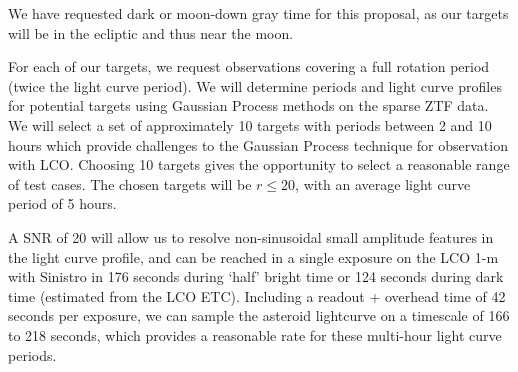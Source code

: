 \documentclass[11pt]{article}
\begin{document}


%

\technicaldescription
We have requested dark or moon-down gray time for this proposal, as our
targets will be in the ecliptic and thus near the moon.

For each of our targets, we request observations covering a
full rotation period (twice the light curve period). We will determine
periods and light curve profiles for potential targets using Gaussian
Process methods on the sparse ZTF data. We will select a set of
approximately 10 targets with periods between 2 and 10 hours which
provide challenges to the Gaussian Process technique for observation
with LCO. Choosing 10 targets gives the opportunity to select a reasonable range
of test cases. The chosen targets will be $r\le20$, with an average 
light curve period of 5 hours.

A SNR of 20 will allow us to resolve non-sinusoidal small amplitude
features in the light curve profile, and can be reached in a single
exposure on the LCO 1-m with Sinistro in 176 seconds during
`half' bright time or 124 seconds during dark time (estimated from the
LCO ETC). Including a readout + overhead time of 42 seconds per
exposure, we can sample the asteroid lightcurve on a timescale of 166
to 218 seconds, which provides a reasonable rate for these multi-hour
light curve periods.
\end{document}
